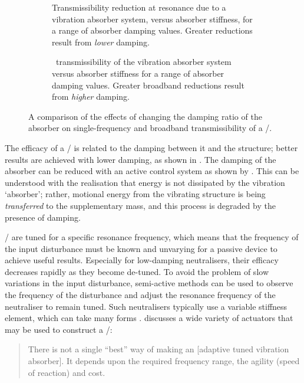 \begin{figure}
\begin{wide}
  \begin{subfigure}
    \caption{
      Transmissibility reduction at resonance due to a vibration absorber system, versus absorber stiffness, for a range of absorber damping values.
      Greater reductions result from \emph{lower} damping.}
  \end{subfigure}
  \begin{subfigure}
    \caption{
      \RMS\ transmissibility of the vibration absorber system versus absorber stiffness for a range of absorber damping values.
    Greater broadband reductions result from \emph{higher} damping.}
  \end{subfigure}
\end{wide}
\caption{
  A comparison of the effects of changing the damping ratio of the absorber on single-frequency and broadband transmissibility of a \vibneut/.
}
\end{figure}

The efficacy of a \vibneut/ is related to the damping between it and the structure; better results are achieved with lower damping, as shown in .
The damping of the absorber can be reduced with an active control system as shown by \textcite{kidner1998}.
This can be understood with the realisation that energy is not dissipated by the vibration `absorber'; rather, motional energy from the vibrating structure is being \emph{transferred} to the supplementary mass, and this process is degraded by the presence of damping.

\Vibneut/ are tuned for a specific resonance frequency, which means that the frequency of the input disturbance must be known and unvarying for a passive device to achieve useful results.
Especially for low-damping neutralisers, their efficacy decreases rapidly as they become de-tuned.
To avoid the problem of slow variations in the input disturbance, semi-active methods can be used to observe the frequency of the disturbance and adjust the resonance frequency of the neutraliser to remain tuned.
Such neutralisers typically use a variable stiffness element, which can take many forms \cite{ting-kong1999,kidner2002,holdhusen2007}.
\textcite{brennan2006} discusses a wide variety of actuators that may be used to construct a \vibneut/:
\begin{quote}
There is not a single ``best'' way of making an [adaptive tuned vibration absorber].
It depends upon the required frequency range, the agility (speed of reaction) and cost.
\end{quote}

